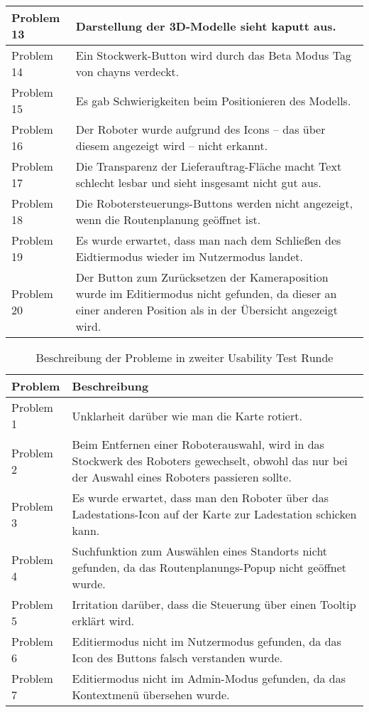 \begin{table}[H]
\begin{tabular}{l|l}
        Problem 13  & \multicolumn{1}{p{12cm}}{Darstellung der 3D-Modelle sieht kaputt aus.} \\ \hline
        Problem 14  & \multicolumn{1}{p{12cm}}{Ein Stockwerk-Button wird durch das Beta Modus Tag von chayns verdeckt.} \\ \hline
        Problem 15  & \multicolumn{1}{p{12cm}}{Es gab Schwierigkeiten beim Positionieren des Modells.} \\ \hline
        Problem 16  & \multicolumn{1}{p{12cm}}{Der Roboter wurde aufgrund des Icons – das über diesem angezeigt wird – nicht erkannt.} \\ \hline
        Problem 17  & \multicolumn{1}{p{12cm}}{Die Transparenz der Lieferauftrag-Fläche macht Text schlecht lesbar und sieht insgesamt nicht gut aus.} \\ \hline
        Problem 18  & \multicolumn{1}{p{12cm}}{Die Robotersteuerungs-Buttons werden nicht angezeigt, wenn die Routenplanung geöffnet ist.} \\ \hline
        Problem 19  & \multicolumn{1}{p{12cm}}{Es wurde erwartet, dass man nach dem Schließen des Eidtiermodus wieder im Nutzermodus landet.} \\ \hline
        Problem 20  & \multicolumn{1}{p{12cm}}{Der Button zum Zurücksetzen der Kameraposition wurde im Editiermodus nicht gefunden, da dieser an einer anderen Position als in der Übersicht angezeigt wird.} \\
    \end{tabular}
\end{table}
\begin{table}[H]
    \caption{Beschreibung der Probleme in zweiter Usability Test Runde}\label{tbl:2ndUsabilityTestsProblemsDesc}
    \begin{tabular}{l|l}
        Problem     & Beschreibung \\ \hline
        Problem 1   & \multicolumn{1}{p{12cm}}{Unklarheit darüber wie man die Karte rotiert.} \\ \hline
        Problem 2   & \multicolumn{1}{p{12cm}}{Beim Entfernen einer Roboterauswahl, wird in das Stockwerk des Roboters gewechselt, obwohl das nur bei der Auswahl eines Roboters passieren sollte.} \\ \hline
        Problem 3   & \multicolumn{1}{p{12cm}}{Es wurde erwartet, dass man den Roboter über das Ladestations-Icon auf der Karte zur Ladestation schicken kann.} \\ \hline
        Problem 4   & \multicolumn{1}{p{12cm}}{Suchfunktion zum Auswählen eines Standorts nicht gefunden, da das Routenplanungs-Popup nicht geöffnet wurde.} \\ \hline
        Problem 5   & \multicolumn{1}{p{12cm}}{Irritation darüber, dass die Steuerung über einen Tooltip erklärt wird.} \\ \hline
        Problem 6   & \multicolumn{1}{p{12cm}}{Editiermodus nicht im Nutzermodus gefunden, da das Icon des Buttons falsch verstanden wurde.} \\ \hline
        Problem 7   & \multicolumn{1}{p{12cm}}{Editiermodus nicht im Admin-Modus gefunden, da das Kontextmenü übersehen wurde.}
    \end{tabular}
\end{table}
